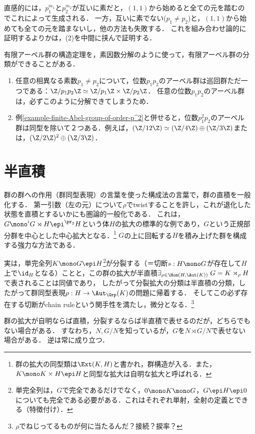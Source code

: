 \documentclass[uplatex,dvipdfmx]{jsreport}
\begin{document}
\begin{remarks}
    直感的には，$p_1^{m_1}$と$p_2^{m_2}$が互いに素だと，$(1,1)$から始めると全ての元を踏むのでこれによって生成される．
    一方，互いに素でない($p_1\ne p_2$)と，$(1,1)$から始めても全ての元を踏まないし，他の方法も失敗する．
    これを組み合わせ論的に証明するよりかは，(2)を中間に挟んで証明する．
\end{remarks}

\begin{example}\label{exp-classification-by-the-structure-theorem-of-Abelian-group}
    有限アーベル群の構造定理を，素因数分解のように使って，有限アーベル群の分類ができることがある．
    \begin{enumerate}
        \item 任意の相異なる素数$p_1\ne p_2$について，位数$p_1p_2$のアーベル群は巡回群ただ一つである：$\Z/p_1p_2\Z\simeq\Z/p_1\Z\times\Z/p_2\Z$．
        任意の位数$p_1p_2$のアーベル群は，必ずこのように分解できてしまうため．
        \item 例\ref{example-finite-Abel-group-of-order-p^2}と併せると，位数$p_1^2p_2$のアーベル群は同型を除いて２つある．例えば，$(\Z/12\Z)\simeq(\Z/4\Z)\oplus(\Z/3\Z)$または，$(\Z/2\Z)^2\oplus(\Z/3\Z)$．
    \end{enumerate}
\end{example}

\section{半直積}

\begin{tcolorbox}[colframe=ForestGreen, colback=ForestGreen!10!white,breakable,colbacktitle=ForestGreen!40!white,coltitle=black,fonttitle=\bfseries\sffamily,
title=群の可換性を射で緩める：群の標準的な拡大法]
    群の群への作用（群同型表現）の言葉を使った構成法の言葉で，群の直積を一般化する．
    第一引数（左の元）について$\rho$でtwistすることを許し，これが退化した状態を直積とするいかにも圏論的一般化である．
    これは，$G\mono^i G\rtimes H\epi^{\pr_2} H$という体$H$の拡大の標準的な例であり，$G$という正規部分群を中心とした中心拡大となる．\footnote{群の拡大の同型類は$\Ext(K,H)$と書かれ，群構造が入る．また，$K\mono K\times H\epi H$と同型な拡大は自明な拡大と呼ばれる．}
    $G$の上に回転する$H$を積み上げた群を構成する強力な方法である．

    実は，単完全列$K\mono G\epi H$\footnote{単完全列は，$G$で完全であるだけでなく，$0\mono K\mono G$，$G\epi H\epi 0$についても完全である必要がある．これはそれぞれ単射，全射の定義とできる（特徴付け）．}が分裂する（＝切断$s:H\mono G$が存在して$H$上で$\id_H$となる）ことと，この群の拡大が半直積$\exists_{\rho\in\Hom(H,\Aut(K))}\;G=K\rtimes_\rho H$で表されることは同値であり，
    したがって分裂拡大の分類は半直積の分類，したがって群同型表現$\rho:H\to\Aut_\Grp(K)$の問題に帰着する．
    そしてこの必ず存在する切断がchain ruleという関手性を満たし，微分となる．\footnote{$\rho$でねじってるものが何に当たるんだ？接続？捩率？}

    群の拡大が自明ならば直積，分裂するならば半直積で表せるのだが，どちらでもない場合がある．
    すなわち，$N,G/N$を知っているが，$G$を$N\rtimes G/N$で表せない場合がある．
    逆は常に成り立つ．
\end{tcolorbox}
\end{document}
